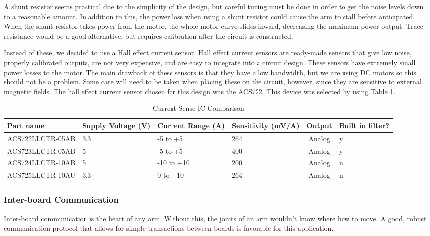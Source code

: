 \noindent A shunt resistor seems practical due to the simplicity of the design, but careful tuning must be done in order to get the noise levels down to a reasonable amount. In addition to this, the power loss when using a shunt resistor could cause the arm to stall before anticipated. When the shunt resistor takes power from the motor, the whole motor curve slides inward, decreasing the maximum power output. Trace resistance would be a good alternative, but requires calibration after the circuit is constructed. 

\noindent Instead of these, we decided to use a Hall effect current sensor. Hall effect current sensors are ready-made sensors that give low noise, properly calibrated outputs, are not very expensive, and are easy to integrate into a circuit design. These sensors have extremely small power losses to the motor. The main drawback of these sensors is that they have a low bandwidth, but we are using DC motors so this should not be a problem. Some care will need to be taken when placing these on the circuit, however, since they are sensitive to external magnetic fields. The hall effect current sensor chosen for this design was the ACS722. This device was selected by using Table \ref{tbl:Current Sense IC Comparison}.

\begin{table}[H]
	\centering
	\caption{Current Sense IC Comparison}
	\begin{tabular}{|p{4.2cm}|p{1.5cm}|p{2cm}|p{1.7cm}|c|p{1.4cm}|}
\hline
Part name & Supply Voltage (V) & Current Range (A) & Sensitivity (mV/A) & Output & Built in filter? \\
\hline

ACS722LLCTR-05AB & 3.3 & -5 to +5 & 264 & Analog & y \\

ACS723LLCTR-05AB & 5 & -5 to +5 & 400 & Analog & y \\

ACS724LLCTR-10AB & 5 & -10 to +10 & 200 & Analog & n \\

ACS725LLCTR-10AU & 3.3 & 0 to +10 & 264 & Analog & n \\
\hline

\end{tabular}

	\label{tbl:Current Sense IC Comparison}
\end{table}

\subsubsection{Inter-board Communication}
Inter-board communication is the heart of any arm. Without this, the joints of an arm wouldn't know where how to move. A good, robust communication protocol that allows for simple transactions between boards is favorable for this application.

